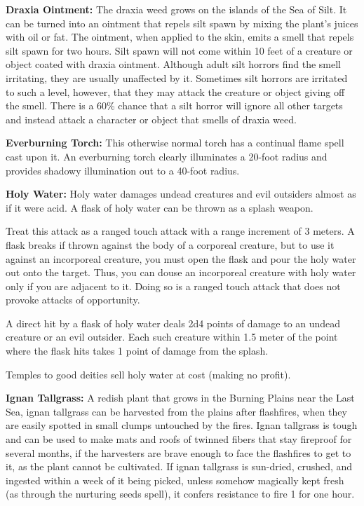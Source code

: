 \textbf{Draxia Ointment:} The draxia weed grows on the islands of the Sea of Silt. It can be turned into an ointment that repels silt spawn by mixing the plant's juices with oil or fat. The ointment, when applied to the skin, emits a smell that repels silt spawn for two hours. Silt spawn will not come within 10 feet of a creature or object coated with draxia ointment. Although adult silt horrors find the smell irritating, they are usually unaffected by it. Sometimes silt horrors are irritated to such a level, however, that they may attack the creature or object giving off the smell. There is a 60\% chance that a silt horror will ignore all other targets and instead attack a character or object that smells of draxia weed.

\textbf{Everburning Torch:} This otherwise normal torch has a continual flame spell cast upon it. An everburning torch clearly illuminates a 20-foot radius and provides shadowy illumination out to a 40-foot radius.

\textbf{Holy Water:} Holy water damages undead creatures and evil outsiders almost as if it were acid. A flask of holy water can be thrown as a splash weapon.

Treat this attack as a ranged touch attack with a range increment of 3 meters. A flask breaks if thrown against the body of a corporeal creature, but to use it against an incorporeal creature, you must open the flask and pour the holy water out onto the target. Thus, you can douse an incorporeal creature with holy water only if you are adjacent to it. Doing so is a ranged touch attack that does not provoke attacks of opportunity.

A direct hit by a flask of holy water deals 2d4 points of damage to an undead creature or an evil outsider. Each such creature within 1.5 meter of the point where the flask hits takes 1 point of damage from the splash.

Temples to good deities sell holy water at cost (making no profit).

\textbf{Ignan Tallgrass:} A redish plant that grows in the Burning Plains near the Last Sea, ignan tallgrass can be harvested from the plains after flashfires, when they are easily spotted in small clumps untouched by the fires. Ignan tallgrass is tough and can be used to make mats and roofs of twinned fibers that stay fireproof for several months, if the harvesters are brave enough to face the flashfires to get to it, as the plant cannot be cultivated. If ignan tallgrass is sun-dried, crushed, and ingested within a week of it being picked, unless somehow magically kept fresh (as through the nurturing seeds spell), it confers resistance to fire 1 for one hour.

